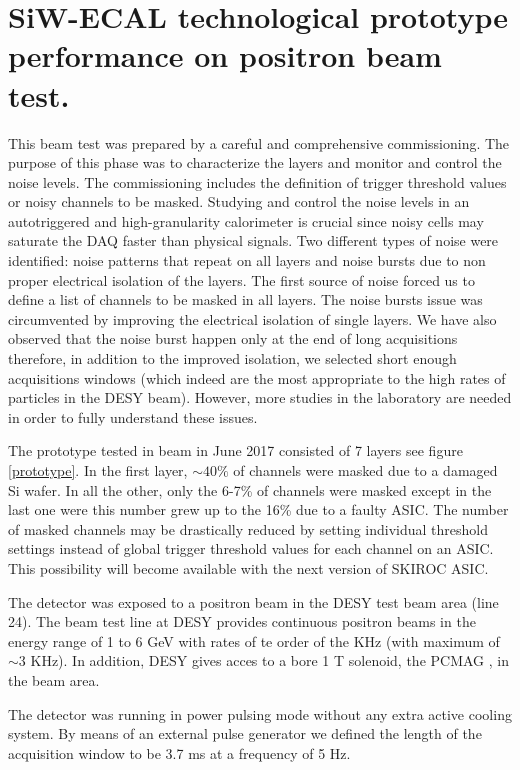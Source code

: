 \documentclass[journal]{IEEEtran}
\begin{document}
\section{SiW-ECAL technological prototype performance on positron beam test.}

This beam test was prepared by a careful and comprehensive commissioning.
The purpose of this phase was to characterize the layers and monitor and control the
noise levels. The commissioning includes the definition of trigger threshold values or noisy channels to be masked.
Studying and control the noise levels in an autotriggered and high-granularity calorimeter
is crucial since noisy cells may saturate the DAQ faster than physical signals.
Two different types of noise were identified:
noise patterns that repeat on all layers 
and noise bursts due to non proper electrical isolation of the layers.
The first source of noise forced us to define a list of channels to be masked in all layers.
The noise bursts issue was circumvented by improving the electrical isolation of single layers.
We have also observed that the noise burst happen only at the end of long acquisitions therefore, in addition to the improved isolation,
we selected short enough acquisitions windows (which indeed are the most appropriate to the high rates of particles in the DESY beam).
However, more studies in the laboratory are needed in order to fully understand these issues.

The prototype tested in beam in June 2017 consisted of 7 layers see figure \ref{prototype}.
In the first layer, $\sim 40\%$ of channels were masked due to a damaged Si wafer. In all the other, only the 6-7\% of channels were masked except in the last one were this number grew up to the 16\% due to a faulty ASIC. The number of masked channels may be drastically reduced by setting individual threshold settings instead of global trigger threshold values for each channel on an ASIC. This possibility will become available with the next version of SKIROC ASIC.

The detector was exposed to a positron beam in the DESY test beam area (line 24).
The beam test line at DESY provides continuous positron beams in the energy range of 1 to 6 GeV with
rates of te order of the KHz (with maximum of $\sim 3$ KHz). In addition, DESY gives acces to a bore 1 T solenoid, the PCMAG \cite{pcmag}, in the beam area. 

The detector was running in power pulsing mode without any extra active cooling system.
By means of an external pulse generator we defined the length of the acquisition window to be
3.7 ms at a frequency of 5 Hz. %
\end{document}
